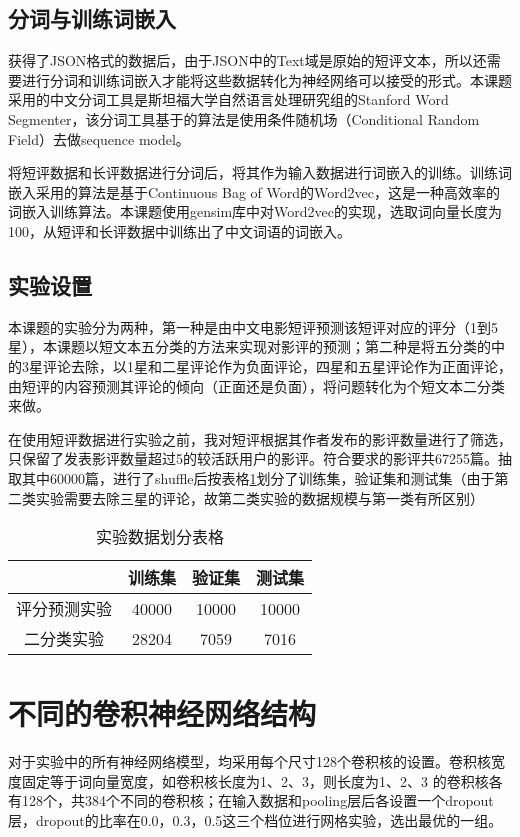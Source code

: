 \subsection{分词与训练词嵌入}
获得了JSON格式的数据后，由于JSON中的Text域是原始的短评文本，所以还需要进行分词和训练词嵌入才能将这些数据转化为神经网络可以接受的形式。本课题采用的中文分词工具是斯坦福大学自然语言处理研究组的Stanford Word Segmenter，该分词工具基于的算法是使用条件随机场（Conditional Random Field）去做sequence model。

将短评数据和长评数据进行分词后，将其作为输入数据进行词嵌入的训练。训练词嵌入采用的算法是基于Continuous Bag of Word的Word2vec，这是一种高效率的词嵌入训练算法。本课题使用gensim库中对Word2vec的实现，选取词向量长度为100，从短评和长评数据中训练出了中文词语的词嵌入。

\subsection{实验设置}
本课题的实验分为两种，第一种是由中文电影短评预测该短评对应的评分（1到5星），本课题以短文本五分类的方法来实现对影评的预测；第二种是将五分类的中的3星评论去除，以1星和二星评论作为负面评论，四星和五星评论作为正面评论，由短评的内容预测其评论的倾向（正面还是负面），将问题转化为个短文本二分类来做。

在使用短评数据进行实验之前，我对短评根据其作者发布的影评数量进行了筛选，只保留了发表影评数量超过5的较活跃用户的影评。符合要求的影评共67255篇。抽取其中60000篇，进行了shuffle后按表格\ref{tab:data divide}划分了训练集，验证集和测试集（由于第二类实验需要去除三星的评论，故第二类实验的数据规模与第一类有所区别）

\begin{table}
\centering
\caption{实验数据划分表格} \label{tab:data divide}
\begin{tabular}{c|c|c|c}
    \hline
     &训练集 & 验证集 & 测试集\\
    \hline
    评分预测实验 & 40000 & 10000 & 10000\\
    \hline
    二分类实验 & 28204 & 7059 & 7016\\
    \hline
\end{tabular}
\end{table}



\section{不同的卷积神经网络结构}
对于实验中的所有神经网络模型，均采用每个尺寸128个卷积核的设置。卷积核宽度固定等于词向量宽度，如卷积核长度为1、2、3，则长度为1、2、3 的卷积核各有128个，共384个不同的卷积核；在输入数据和pooling层后各设置一个dropout层，dropout的比率在0.0，0.3，0.5这三个档位进行网格实验，选出最优的一组。

